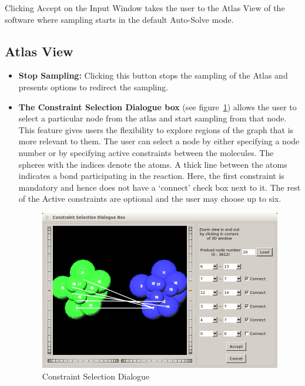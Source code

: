 \documentclass[10pt]{article}
\begin{document}
Clicking Accept on the Input Window takes the user to the Atlas View of the
software where sampling starts in the default Auto-Solve mode.

\subsection{Atlas View}

\begin{itemize}
\item \textbf{Stop Sampling:} Clicking this button stops the sampling of the
		Atlas and presents options to redirect the sampling.
\item \textbf{The Constraint Selection Dialogue box }(see figure~\ref{DSD})
		allows the user to select a particular node from the atlas and start
		sampling from that node. This feature gives users the flexibility to
		explore regions of the graph that is more relevant to them. The user
		can select a node by either specifying a node number or by specifying
		active constraints between the molecules. The spheres with the indices
		denote the atoms. A thick line between the atoms indicates a bond
		participating in the reaction. Here, the first constraint is mandatory
		and hence does not have a `connect' check box next to it. The rest of
		the Active constraints are optional and the user may choose up to six.
		\begin{figure}[h]
				\centering
				\includegraphics[scale=0.5] {fig/DumbbellSelection.png}
				\caption{Constraint Selection Dialogue}
				\label{DSD}
		\end{figure}


\end{itemize}
\end{document}

